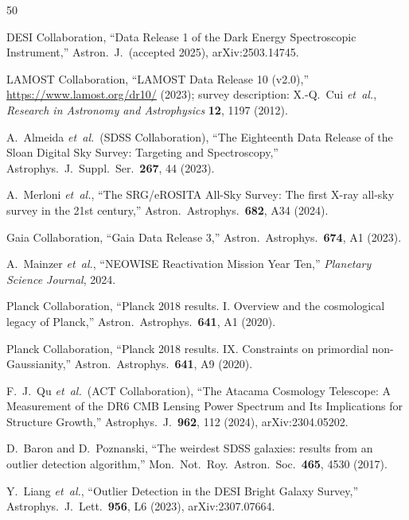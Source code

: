 \documentclass[aps,prd,twocolumn,superscriptaddress,showpacs,preprintnumbers,nofootinbib,longbibliography,floatfix]{revtex4-2}
\newcommand{\etal}{\textit{et~al.}}
\begin{document}
\clearpage
\begin{thebibliography}{50}

DESI Collaboration,
``Data Release 1 of the Dark Energy Spectroscopic Instrument,''
Astron.\ J.\ (accepted 2025), arXiv:2503.14745.

LAMOST Collaboration,
``LAMOST Data Release 10 (v2.0),''
\url{https://www.lamost.org/dr10/} (2023);
survey description: X.-Q.\ Cui \etal,
\textit{Research in Astronomy and Astrophysics} \textbf{12}, 1197 (2012).

A.\ Almeida \etal\ (SDSS Collaboration),
``The Eighteenth Data Release of the Sloan Digital Sky Survey: Targeting and Spectroscopy,''
Astrophys.\ J.\ Suppl.\ Ser.\ \textbf{267}, 44 (2023).

A.\ Merloni \etal,
``The SRG/eROSITA All-Sky Survey: The first X-ray all-sky survey in the 21st century,''
Astron.\ Astrophys.\ \textbf{682}, A34 (2024).

Gaia Collaboration,
``Gaia Data Release 3,''
Astron.\ Astrophys.\ \textbf{674}, A1 (2023).

A.\ Mainzer \etal,
``NEOWISE Reactivation Mission Year Ten,''
\textit{Planetary Science Journal}, 2024.

Planck Collaboration,
``Planck 2018 results. I. Overview and the cosmological legacy of Planck,''
Astron.\ Astrophys.\ \textbf{641}, A1 (2020).

Planck Collaboration,
``Planck 2018 results. IX. Constraints on primordial non-Gaussianity,''
Astron.\ Astrophys.\ \textbf{641}, A9 (2020).

F.\ J.\ Qu \etal\ (ACT Collaboration),
``The Atacama Cosmology Telescope: A Measurement of the DR6 CMB Lensing Power Spectrum and Its Implications for Structure Growth,''
Astrophys.\ J.\ \textbf{962}, 112 (2024), arXiv:2304.05202.

D.\ Baron and D.\ Poznanski,
``The weirdest SDSS galaxies: results from an outlier detection algorithm,''
Mon.\ Not.\ Roy.\ Astron.\ Soc.\ \textbf{465}, 4530 (2017).

Y.\ Liang \etal,
``Outlier Detection in the DESI Bright Galaxy Survey,''
Astrophys.\ J.\ Lett.\ \textbf{956}, L6 (2023), arXiv:2307.07664.


\end{thebibliography}
\end{document}
